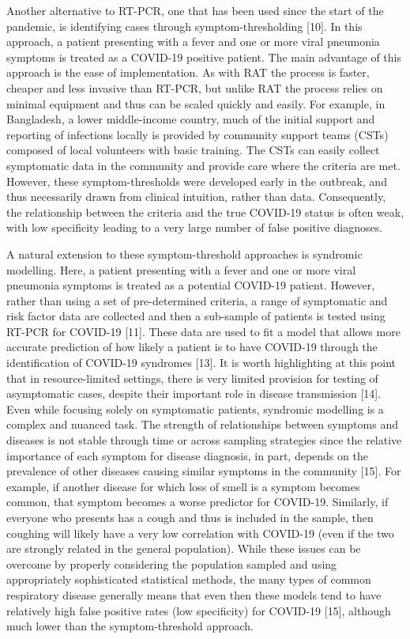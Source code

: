 \documentclass[]{elsarticle} %
\begin{document}
Another alternative to RT-PCR, one that has been used since the start of the pandemic, is identifying cases through symptom-thresholding {[}10{]}.
In this approach, a patient presenting with a fever and one or more viral pneumonia symptoms is treated as a COVID-19 positive patient.
The main advantage of this approach is the ease of implementation.
As with RAT the process is faster, cheaper and less invasive than RT-PCR, but unlike RAT the process relies on minimal equipment and thus can be scaled quickly and easily.
For example, in Bangladesh, a lower middle-income country, much of the initial support and reporting of infections locally is provided by community support teams (CSTs) composed of local volunteers with basic training.
The CSTs can easily collect symptomatic data in the community and provide care where the criteria are met.
However, these symptom-thresholds were developed early in the outbreak, and thus necessarily drawn from clinical intuition, rather than data.
Consequently, the relationship between the criteria and the true COVID-19 status is often weak, with low specificity leading to a very large number of false positive diagnoses.

A natural extension to these symptom-threshold approaches is syndromic modelling.
Here, a patient presenting with a fever and one or more viral pneumonia symptoms is treated as a potential COVID-19 patient.
However, rather than using a set of pre-determined criteria, a range of symptomatic and risk factor data are collected and then a sub-sample of patients is tested using RT-PCR for COVID-19 {[}11{]}.
These data are used to fit a model that allows more accurate prediction of how likely a patient is to have COVID-19 through the identification of COVID-19 syndromes {[}13{]}.
It is worth highlighting at this point that in resource-limited settings, there is very limited provision for testing of asymptomatic cases, despite their important role in disease transmission {[}14{]}.
Even while focusing solely on symptomatic patients, syndromic modelling is a complex and nuanced task.
The strength of relationships between symptoms and diseases is not stable through time or across sampling strategies since the relative importance of each symptom for disease diagnosis, in part, depends on the prevalence of other diseases causing similar symptoms in the community {[}15{]}.
For example, if another disease for which loss of smell is a symptom becomes common, that symptom becomes a worse predictor for COVID-19.
Similarly, if everyone who presents has a cough and thus is included in the sample, then coughing will likely have a very low correlation with COVID-19 (even if the two are strongly related in the general population).
While these issues can be overcome by properly considering the population sampled and using appropriately sophisticated statistical methods, the many types of common respiratory disease generally means that even then these models tend to have relatively high false positive rates (low specificity) for COVID-19 {[}15{]}, although much lower than the symptom-threshold approach.
\end{document}
